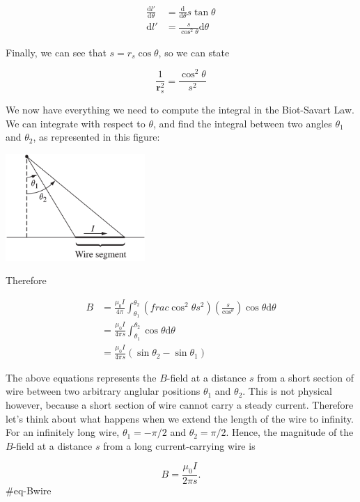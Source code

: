 \documentclass[
  letterpaper,
  DIV=11,
  numbers=noendperiod]{scrreprt}
\begin{document}
\[ \begin{split} 
\frac{\mathrm{d} l'}{\mathrm{d} \theta} &=  \frac{\mathrm{d} }{\mathrm{d} \theta} s \tan\theta \\
\mathrm{d}l' &=  \frac{s}{ \cos^2 \theta} \mathrm{d}\theta
\end{split}
\]

Finally, we can see that \(s = r_s \cos \theta\), so we can state

\[ \frac{1}{\mathrm{\mathbf{r}}_s^2} = \frac{\cos^2 \theta}{s^2} \]

We now have everything we need to compute the integral in the
Biot-Savart Law. We can integrate with respect to \(\theta\), and find
the integral between two angles \(\theta_1\) and \(\theta_2\), as
represented in this figure:

\includegraphics[width=2.08333in,height=\textheight]{Figures/BS-example-2.png}

Therefore

\[ \begin{split} 
B &= \frac{\mu_0 I}{4 \pi} \int_{\theta_1}^{\theta_2} \left( frac{\cos^2 \theta }{s^2} \right) \left( \frac{s}{\cos^\theta} \right) \cos\theta \mathrm{d}\theta   \\
 &= \frac{\mu_0 I}{4 \pi s} \int_{\theta_1}^{\theta_2}  \cos\theta \mathrm{d}\theta \\
 &= \frac{\mu_0 I}{4 \pi s} (\sin\theta_2 - \sin \theta_1) 
\end{split}
\]

The above equations represents the \(B\)-field at a distance \(s\) from
a short section of wire between two arbitrary anglular positions
\(\theta_1\) and \(\theta_2\). This is not physical however, because a
short section of wire cannot carry a steady current. Therefore let's
think about what happens when we extend the length of the wire to
infinity. For an infinitely long wire, \(\theta_1 = -\pi/2\) and
\(\theta_2 = \pi/2\). Hence, the magnitude of the \(B\)-field at a
distance \(s\) from a long current-carrying wire is

\[ B = \frac{\mu_0 I}{2\pi s}. \]\#eq-Bwire
\end{document}
